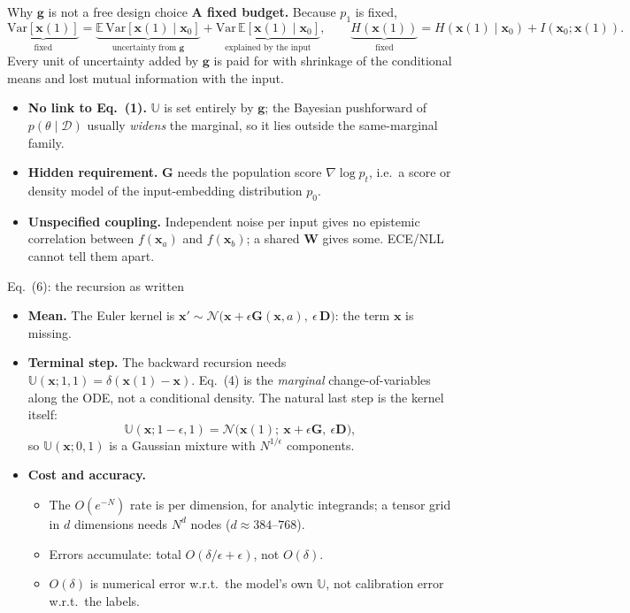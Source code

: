 \documentclass[aspectratio=169,11pt]{beamer}
\newcommand{\U}{\mathbb{U}}
\newcommand{\E}{\mathbb{E}}
\newcommand{\Var}{\mathrm{Var}}
\newcommand{\x}{\bm{x}}
\newcommand{\g}{\bm{g}}
\newcommand{\G}{\bm{G}}
\newcommand{\D}{\bm{D}}
\begin{document}
\begin{frame}{Why $\g$ is not a free design choice}
  \small
  \textbf{A fixed budget.} Because $p_1$ is fixed,
  \[
    \underbrace{\Var[\x(1)]}_{\text{fixed}}
    =\underbrace{\E\,\Var[\x(1)\mid\x_0]}_{\text{uncertainty from }\g}
    +\underbrace{\Var\,\E[\x(1)\mid\x_0]}_{\text{explained by the input}},
    \qquad
    \underbrace{H(\x(1))}_{\text{fixed}} = H(\x(1)\mid\x_0)+I(\x_0;\x(1)).
  \]
  Every unit of uncertainty added by $\g$ is paid for with \alert{shrinkage} of the conditional means and \alert{lost mutual information} with the input.
  \smallskip
  \begin{itemize}
    \item \textbf{No link to Eq.~(1).} $\U$ is set entirely by $\g$; the Bayesian pushforward of $p(\theta\mid\mathcal D)$ usually \emph{widens} the marginal, so it lies outside the same-marginal family.
    \item \textbf{Hidden requirement.} $\G$ needs the population score $\nabla\log p_t$, i.e.\ a score or density model of the input-embedding distribution $p_0$.
    \item \textbf{Unspecified coupling.} Independent noise per input gives no epistemic correlation between $f(\x_a)$ and $f(\x_b)$; a shared $\bm W$ gives some. ECE/NLL cannot tell them apart.
  \end{itemize}
\end{frame}

\begin{frame}{Eq.~(6): the recursion as written}
  \begin{itemize}
    \item \textbf{Mean.} The Euler kernel is $\x'\sim\mathcal N\big(\x+\epsilon\G(\x,a),\ \epsilon\,\D\big)$: the term $\x$ is missing.
    \item \textbf{Terminal step.} The backward recursion needs $\U(\x;1,1)=\delta(\x(1)-\x)$. Eq.~(4) is the \emph{marginal} change-of-variables along the ODE, not a conditional density. The natural last step is the kernel itself:
      \[
        \U(\x;1-\epsilon,1)=\mathcal N\big(\x(1);\ \x+\epsilon\G,\ \epsilon\D\big),
      \]
      so $\U(\x;0,1)$ is a Gaussian mixture with $N^{1/\epsilon}$ components.
    \item \textbf{Cost and accuracy.}
      \begin{itemize}
        \item The $O(e^{-N})$ rate is per dimension, for analytic integrands; a tensor grid in $d$ dimensions needs $N^{d}$ nodes ($d\approx 384$--$768$).
        \item Errors accumulate: total $O(\delta/\epsilon+\epsilon)$, not $O(\delta)$.
        \item $O(\delta)$ is numerical error w.r.t.\ the model's own $\U$, \alert{not calibration error} w.r.t.\ the labels.
      \end{itemize}
  \end{itemize}
\end{frame}
\end{document}
